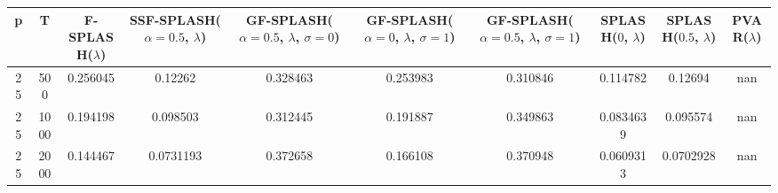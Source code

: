 \begin{tabular}{cccccccccc}
\hline
  p  &  T   &  F-SPLASH($\lambda$)  &  SSF-SPLASH($\alpha=0.5$, $\lambda$)  &  GF-SPLASH($\alpha=0.5$, $\lambda$, $\sigma=0$)  &  GF-SPLASH($\alpha=0$, $\lambda$, $\sigma=1$)  &  GF-SPLASH($\alpha=0.5$, $\lambda$, $\sigma=1$)  &  SPLASH($0$, $\lambda$)  &  SPLASH($0.5$, $\lambda$)  &  PVAR($\lambda$)  \\
\hline
 25  & 500  &       0.256045        &                0.12262                &                     0.328463                     &                    0.253983                    &                     0.310846                     &         0.114782         &          0.12694           &        nan        \\
 25  & 1000 &       0.194198        &               0.098503                &                     0.312445                     &                    0.191887                    &                     0.349863                     &        0.0834639         &          0.095574          &        nan        \\
 25  & 2000 &       0.144467        &               0.0731193               &                     0.372658                     &                    0.166108                    &                     0.370948                     &        0.0609313         &         0.0702928          &        nan        \\
\hline
\end{tabular}